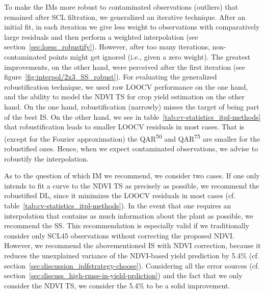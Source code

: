     To make the {{IM}}s more robust to contaminated observations (outliers) that remained after SCL filtration, we generalized an iterative technique. After an initial fit, in each iteration we give less weight to observations with comparatively large residuals and then perform a weighted interpolation (see section~\ref{sec:loess_robustify}). However, after too many iterations, non-contaminated points might get ignored (i.e., given a zero weight). The greatest improvements, on the other hand, were perceived after the first iteration (see figure~\ref{fig:interpol/2x3_SS_robust}). 
    For evaluating the generalized robustification technique, we used raw LOOCV performance on the one hand, and the ability to model the NDVI TS for crop yield estimation on the other hand.
    On the one hand, robustification (narrowly) misses the target of being part of the best {{IS}}. On the other hand, we see in table~\ref{tab:cv-statistics_itpl-methods} that robustification leads to smaller LOOCV residuals in most cases. That is (except for the Fourier approximation) the QAR\textsuperscript{50} and QAR\textsuperscript{75} are smaller for the robustified ones. Hence, when we expect contaminated observations, we advise to robustify the interpolation. 

As to the question of which {{IM}} we recommend, we consider two cases. If one only intends to fit a curve to the NDVI TS as precisely as possible, we recommend the robustified DL, since it minimizes the LOOCV residuals in most cases (cf. table~\ref{tab:cv-statistics_itpl-methods}). In the event that one requires an interpolation that contains as much information about the plant as possible, we recommend the SS. This recommendation is especially valid if we traditionally consider only SCL45 observations without correcting the proposed NDVI. However, we recommend the abovementioned {{IS}} with NDVI correction, because it reduces the unexplained variance of the NDVI-based yield prediction by 5.4\% (cf. section~\ref{sec:discussion_iplfstrategy-choose}). Considering all the error sources (cf. section~\ref{sec:discuss_high-rmse-in-yield-prdiction}) and the fact that we only consider the NDVI {TS}, we consider the 5.4\% to be a solid improvement.%



